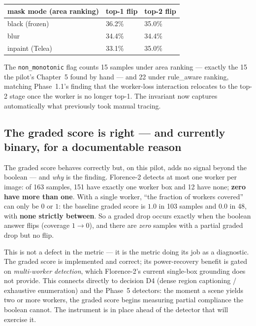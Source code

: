 \begin{center}
\begin{tabular}{p{4.6cm}p{3.2cm}p{3.2cm}}
\toprule
\textbf{mask mode (area ranking)} & \textbf{top-1 flip} & \textbf{top-2 flip} \\
\midrule
black (frozen)  & 36.2\% & 35.0\% \\
blur            & 34.4\% & 34.4\% \\
inpaint (Telea) & 33.1\% & 35.0\% \\
\bottomrule
\end{tabular}
\label{tab:p21-maskmode}
\end{center}

The \texttt{non\_monotonic} flag counts 15 samples under area ranking --- exactly the 15 the pilot's
Chapter~5 found by hand --- and 22 under rule\_aware ranking, matching Phase~1.1's finding that the
worker-loss interaction relocates to the top-2 stage once the worker is no longer top-1. The invariant
now captures automatically what previously took manual tracing.

\subsection{The graded score is right --- and currently binary, for a documentable reason}

The graded score behaves correctly but, on this pilot, adds no signal beyond the boolean --- and
\emph{why} is the finding. Florence-2 detects at most one worker per image: of 163 samples, 151 have
exactly one worker box and 12 have none; \textbf{zero have more than one}. With a single worker, ``the
fraction of workers covered'' can only be $0$ or $1$: the baseline graded score is $1.0$ in 103 samples
and $0.0$ in 48, with \textbf{none strictly between}. So a graded drop occurs exactly when the boolean
answer flips (coverage $1\!\rightarrow\!0$), and there are \emph{zero} samples with a partial graded
drop but no flip.

This is not a defect in the metric --- it is the metric doing its job as a diagnostic. The graded score
is implemented and correct; its power-recovery benefit is gated on \emph{multi-worker detection}, which
Florence-2's current single-box grounding does not provide. This connects directly to decision D4 (dense
region captioning / exhaustive enumeration) and the Phase~5 detectors: the moment a scene yields two or
more workers, the graded score begins measuring partial compliance the boolean cannot. The instrument
is in place ahead of the detector that will exercise it.

